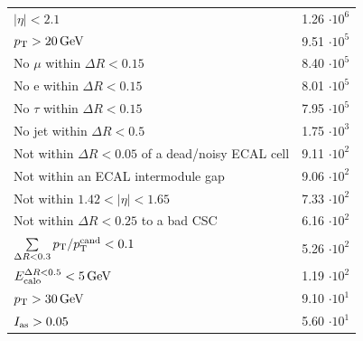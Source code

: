 \begin{table}[!h]
{\begin{tabular}{|l|c|}
$|\eta|<2.1$                                                                              & 1.26 $\cdot10^{6 }$ \\
$p_{\text{T}}>20\,\text{Ge}\kern-0.06667em\text{V}$                                                                              & 9.51 $\cdot10^{5 }$ \\
No $\mu$ within $\Delta R<0.15$                                                           & 8.40 $\cdot10^{5 }$ \\
No e within $\Delta R<0.15$                                                               & 8.01 $\cdot10^{5 }$ \\
No $\tau$ within $\Delta R<0.15$                                                          & 7.95 $\cdot10^{5 }$ \\
No jet within $\Delta R<0.5$                                                              & 1.75 $\cdot10^{3 }$ \\
\makecell[l]{Not within $\Delta R<0.05$ of \\\hfill a dead/noisy ECAL cell}               & 9.11 $\cdot10^{2 }$ \\
Not within an ECAL  intermodule gap                                                       & 9.06 $\cdot10^{2 }$ \\
Not within $1.42<|\eta|<1.65$                                                             & 7.33 $\cdot10^{2 }$ \\
Not within $\Delta R<0.25$ to a bad CSC                                                   & 6.16 $\cdot10^{2 }$ \\
$\sum \limits_{\Delta R < 0.3} p_{\text{T}}/p_{\text{T}}^{\text{cand}} < 0.1$                                & 5.26 $\cdot10^{2 }$ \\
$E^{\Delta R<0.5}_{\text{calo}}<5\,\text{Ge}\kern-0.06667em\text{V}$                                                                            & 1.19 $\cdot10^{2 }$ \\
\midrule
$p_{\text{T}}>30\,\text{Ge}\kern-0.06667em\text{V}$                                                                              & 9.10 $\cdot10^{1 }$ \\
$I_{\text{as}}>0.05$                                                                               & 5.60 $\cdot10^{1 }$ \\
\bottomrule
\end{tabular}}
\end{table}  


\clearpage
